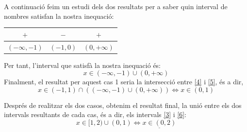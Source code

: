 \begin{itemize}
A continuació feim un estudi dels dos resultats per a saber quin interval de nombres satisfan la nostra inequació:\\
\begin{center}
\begin{tabular}{|c|c|c|}
\hline
$+$&$-$&$+$\\
\hline
$(-\infty,-1)$&$(-1,0)$&$(0,+\infty)$\\
\hline
\end{tabular}
\end{center}
Per tant, l'interval que satisfà la nostra inequació és:
\begin{equation}\label{5}
x\in(-\infty,-1)\cup(0,+\infty)
\end{equation}
Finalment, el resultat per aquest cas 1 seria la intersecció entre \ref{4} i \ref{5}, és a dir, 
\begin{equation}\label{6}
x\in(-1,1)\cap((-\infty,-1)\cup(0,+\infty)) \Leftrightarrow x\in(0,1)
\end{equation}
\end{itemize}
Després de realitzar els dos casos, obtenim el resultat final, la unió entre els dos intervals resultants de cada cas, és a dir, els intervals \ref{3} i \ref{6}:
\begin{equation*}
x\in[1,2)\cup(0,1) \Leftrightarrow \underline{x\in(0,2)}
\end{equation*}